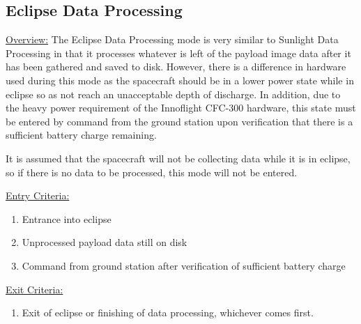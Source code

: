 \documentclass{article}
\begin{document}
\newpage

\subsection{Eclipse Data Processing}

\underline{Overview:} The Eclipse Data Processing mode is very similar to Sunlight Data Processing in that it processes whatever is left of the payload image data after it has been gathered and saved to disk. However, there is a difference in hardware used during this mode as the spacecraft should be in a lower power state while in eclipse so as not reach an unacceptable depth of discharge. In addition, due to the heavy power requirement of the Innoflight CFC-300 hardware, this state must be entered by command from the ground station upon verification that there is a sufficient battery charge remaining.

It is assumed that the spacecraft will not be collecting data while it is in eclipse, so if there is no data to be processed, this mode will not be entered.

\underline{Entry Criteria:} 

\begin{enumerate}
\item Entrance into eclipse
\item Unprocessed payload data still on disk
\item Command from ground station after verification of sufficient battery charge
\end{enumerate}

\underline{Exit Criteria:}

\begin{enumerate}
\item Exit of eclipse or finishing of data processing, whichever comes first.
\end{enumerate}
\end{document}
